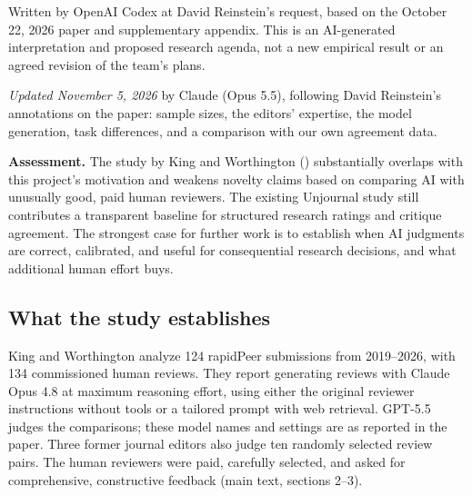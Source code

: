 \documentclass[
  11pt,
  letterpaper,
]{article}
\begin{document}
\begin{tcolorbox}[enhanced jigsaw, colframe=quarto-callout-note-color-frame, breakable, rightrule=.15mm, toptitle=1mm, opacitybacktitle=0.6, opacityback=0, colback=white, bottomtitle=1mm, leftrule=.75mm, toprule=.15mm, coltitle=black, bottomrule=.15mm, titlerule=0mm, title=\textcolor{quarto-callout-note-color}{\faInfo}\hspace{0.5em}{AI-generated research note · October 23, 2026}, colbacktitle=quarto-callout-note-color!10!white, arc=.35mm, left=2mm]

Written by OpenAI Codex at David Reinstein's request, based on the
October 22, 2026 paper and supplementary appendix. This is an
AI-generated interpretation and proposed research agenda, not a new
empirical result or an agreed revision of the team's plans.

\emph{Updated November 5, 2026} by Claude (Opus 5.5), following David
Reinstein's annotations on the paper: sample sizes, the editors'
expertise, the model generation, task differences, and a comparison with
our own agreement data.

\end{tcolorbox}

\textbf{Assessment.} The study by King and Worthington
() substantially
overlaps with this project's motivation and weakens novelty claims based
on comparing AI with unusually good, paid human reviewers. The existing
Unjournal study still contributes a transparent baseline for structured
research ratings and critique agreement. The strongest case for further
work is to establish when AI judgments are correct, calibrated, and
useful for consequential research decisions, and what additional human
effort buys.

\subsection{What the study
establishes}\label{what-the-study-establishes}

King and Worthington analyze 124 rapidPeer submissions from 2019--2026,
with 134 commissioned human reviews. They report generating reviews with
Claude Opus 4.8 at maximum reasoning effort, using either the original
reviewer instructions without tools or a tailored prompt with web
retrieval. GPT-5.5 judges the comparisons; these model names and
settings are as reported in the paper. Three former journal editors also
judge ten randomly selected review pairs. The human reviewers were paid,
carefully selected, and asked for comprehensive, constructive feedback
(main text, sections 2--3).
\end{document}
